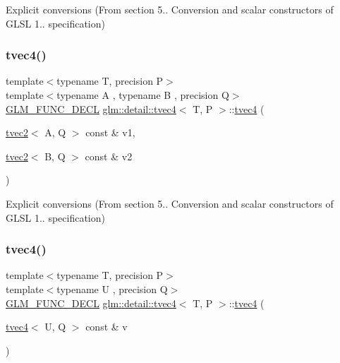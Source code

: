 Explicit conversions (From section 5.. Conversion and scalar constructors of G\+L\+SL 1.. specification) 

\mbox{\label{structglm_1_1detail_1_1tvec4_a1aa94df5eda41024d31fb335a3a14026}} 
\subsubsection{\texorpdfstring{tvec4()}{tvec4()}\hspace{0.1cm}{\footnotesize\ttfamily [13/23]}}
{\footnotesize\ttfamily template$<$typename T, precision P$>$ \\
template$<$typename A , typename B , precision Q$>$ \\
\hyperlink{setup_8hpp_ab2d052de21a70539923e9bcbf6e83a51}{G\+L\+M\+\_\+\+F\+U\+N\+C\+\_\+\+D\+E\+CL} \hyperlink{structglm_1_1detail_1_1tvec4}{glm\+::detail\+::tvec4}$<$ T, P $>$\+::\hyperlink{structglm_1_1detail_1_1tvec4}{tvec4} (\begin{DoxyParamCaption}\item[{\hyperlink{structglm_1_1detail_1_1tvec2}{tvec2}$<$ A, Q $>$ const \&}]{v1,  }\item[{\hyperlink{structglm_1_1detail_1_1tvec2}{tvec2}$<$ B, Q $>$ const \&}]{v2 }\end{DoxyParamCaption})\hspace{0.3cm}{\ttfamily [explicit]}}



Explicit conversions (From section 5.. Conversion and scalar constructors of G\+L\+SL 1.. specification) 

\mbox{\label{structglm_1_1detail_1_1tvec4_ad57045d32f9c47a4afbb3d7524fe24ee}} 
\subsubsection{\texorpdfstring{tvec4()}{tvec4()}\hspace{0.1cm}{\footnotesize\ttfamily [14/23]}}
{\footnotesize\ttfamily template$<$typename T, precision P$>$ \\
template$<$typename U , precision Q$>$ \\
\hyperlink{setup_8hpp_ab2d052de21a70539923e9bcbf6e83a51}{G\+L\+M\+\_\+\+F\+U\+N\+C\+\_\+\+D\+E\+CL} \hyperlink{structglm_1_1detail_1_1tvec4}{glm\+::detail\+::tvec4}$<$ T, P $>$\+::\hyperlink{structglm_1_1detail_1_1tvec4}{tvec4} (\begin{DoxyParamCaption}\item[{\hyperlink{structglm_1_1detail_1_1tvec4}{tvec4}$<$ U, Q $>$ const \&}]{v }\end{DoxyParamCaption})\hspace{0.3cm}{\ttfamily [explicit]}}



